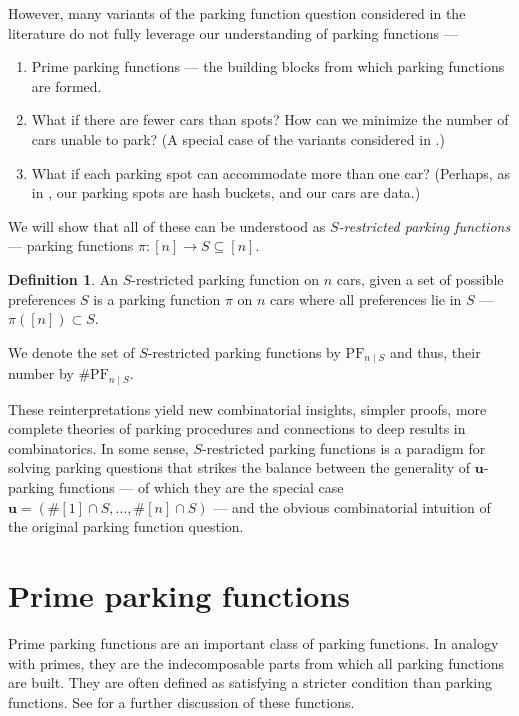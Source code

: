 \documentclass[12 pt]{amsart}
\theoremstyle{definition} %
\newtheorem{definition}[theorem]{Definition}
\theoremstyle{remark} %
\begin{document}
However, many variants of the parking function question considered in the literature do not fully leverage our understanding of parking functions ---
\begin{enumerate}
	\item Prime parking functions --- the building blocks from which parking functions are formed.
	\item What if there are fewer cars than spots? How can we minimize the number of cars unable to park? (A special case of the variants considered in \cite{cameron-johannsen-prellberg-schweitzer-2008}.)
	\item What if each parking spot can accommodate more than one car? (Perhaps, as in \cite{blake-konheim-1977}, our parking spots are hash buckets, and our cars are data.)
\end{enumerate}
We will show that all of these can be understood as \emph{$S$-restricted parking functions} --- parking functions $\pi : [n] \to S \subseteq [n]$.

\begin{definition}
    An $S$-restricted parking function on $n$ cars, given a set of possible preferences $S$ is a parking function $\pi$ on $n$ cars where all preferences lie in $S$ --- $\pi([n]) \subset S$.

    We denote the set of $S$-restricted parking functions by $\mathrm{PF}_{n \mid S}$ and thus, their number by $\# \mathrm{PF}_{n \mid S}$.
\end{definition}


These reinterpretations yield new combinatorial insights, simpler proofs, more complete theories of parking procedures and connections to deep results in combinatorics. In some sense, $S$-restricted parking functions is a paradigm for solving parking questions that strikes the balance between the generality of $\mathbf{u}$-parking functions --- of which they are the special case $\mathbf{u} = ( \# [1] \cap S , \dots, \# [n] \cap S)$  --- and the obvious combinatorial intuition of the original parking function question.

\section{Prime parking functions} \label{primesection}

Prime parking functions are an important class of parking functions. In analogy with primes, they are the indecomposable parts from which all parking functions are built. They are often defined as satisfying a stricter condition than parking functions. See \cite{armon-2024} for a further discussion of these functions.
\end{document}
